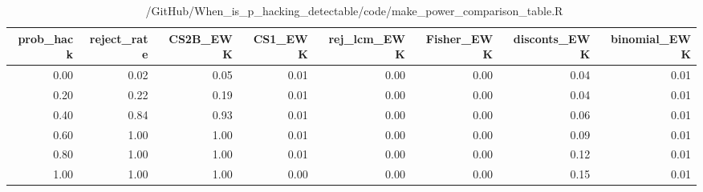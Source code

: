 \begin{table}[ht]
\centering
\begin{tabular}{rrrrrrrr}
  \hline
prob\_hack & reject\_rate & CS2B\_EWK & CS1\_EWK & rej\_lcm\_EWK & Fisher\_EWK & disconts\_EWK & binomial\_EWK \\ 
  \hline
0.00 & 0.02 & 0.05 & 0.01 & 0.00 & 0.00 & 0.04 & 0.01 \\ 
  0.20 & 0.22 & 0.19 & 0.01 & 0.00 & 0.00 & 0.04 & 0.01 \\ 
  0.40 & 0.84 & 0.93 & 0.01 & 0.00 & 0.00 & 0.06 & 0.01 \\ 
  0.60 & 1.00 & 1.00 & 0.01 & 0.00 & 0.00 & 0.09 & 0.01 \\ 
  0.80 & 1.00 & 1.00 & 0.01 & 0.00 & 0.00 & 0.12 & 0.01 \\ 
  1.00 & 1.00 & 1.00 & 0.00 & 0.00 & 0.00 & 0.15 & 0.01 \\ 
   \hline
\end{tabular}
\caption{~/GitHub/When_is_p_hacking_detectable/code/make_power_comparison_table.R} 
\label{tab:comparison}
\end{table}
